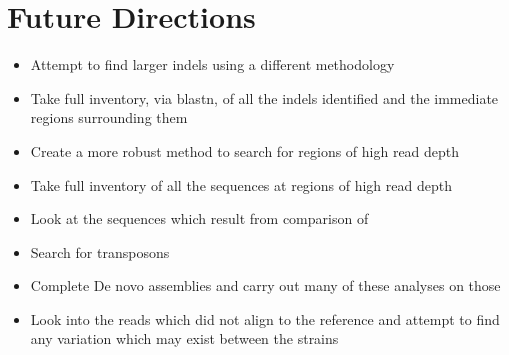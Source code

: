 \documentclass[12pt]{article}
\begin{document}
\section{Future Directions}
\begin{itemize}
\item Attempt to find larger indels using a different methodology
\vspace{-0.5cm}
\item Take full inventory, via blastn, of all the indels identified and the immediate regions surrounding them 
\vspace{-0.5cm}
\item Create a more robust method to search for regions of high read depth
\vspace{-0.5cm}
\item Take full inventory of all the sequences at regions of high read depth
\vspace{-0.5cm}
\item Look at the sequences which result from comparison of 
\vspace{-0.5cm}
\item Search for transposons
\vspace{-0.5cm}
\item Complete De novo assemblies and carry out many of these analyses on those
\vspace{-0.5cm}
\item Look into the reads which did not align to the reference and attempt to find any variation which may exist between the strains
\end{itemize}
\end{document}
